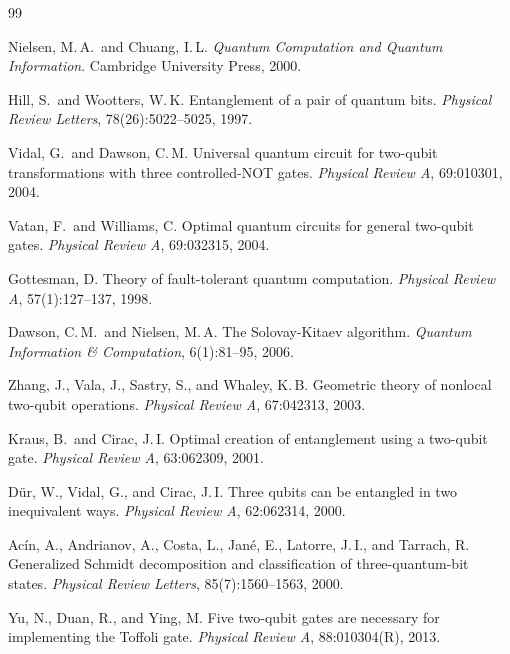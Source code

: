 \documentclass[12pt, a4paper, oneside]{report}
\theoremstyle{plain}
\theoremstyle{definition}
\theoremstyle{remark}
\begin{document}
\clearpage
{}

\begin{thebibliography}{99}

Nielsen, M.\,A.\ and Chuang, I.\,L.
\textit{Quantum Computation and Quantum Information}.
Cambridge University Press, 2000.

Hill, S.\ and Wootters, W.\,K.
Entanglement of a pair of quantum bits.
\textit{Physical Review Letters}, 78(26):5022--5025, 1997.

Vidal, G.\ and Dawson, C.\,M.
Universal quantum circuit for two-qubit transformations with three controlled-NOT gates.
\textit{Physical Review A}, 69:010301, 2004.

Vatan, F.\ and Williams, C.
Optimal quantum circuits for general two-qubit gates.
\textit{Physical Review A}, 69:032315, 2004.

Gottesman, D.
Theory of fault-tolerant quantum computation.
\textit{Physical Review A}, 57(1):127--137, 1998.

Dawson, C.\,M.\ and Nielsen, M.\,A.
The Solovay-Kitaev algorithm.
\textit{Quantum Information \& Computation}, 6(1):81--95, 2006.

Zhang, J., Vala, J., Sastry, S., and Whaley, K.\,B.
Geometric theory of nonlocal two-qubit operations.
\textit{Physical Review A}, 67:042313, 2003.

Kraus, B.\ and Cirac, J.\,I.
Optimal creation of entanglement using a two-qubit gate.
\textit{Physical Review A}, 63:062309, 2001.

D\"{u}r, W., Vidal, G., and Cirac, J.\,I.
Three qubits can be entangled in two inequivalent ways.
\textit{Physical Review A}, 62:062314, 2000.

Ac\'{i}n, A., Andrianov, A., Costa, L., Jan\'{e}, E., Latorre, J.\,I., and Tarrach, R.
Generalized Schmidt decomposition and classification of three-quantum-bit states.
\textit{Physical Review Letters}, 85(7):1560--1563, 2000.

Yu, N., Duan, R., and Ying, M.
Five two-qubit gates are necessary for implementing the Toffoli gate.
\textit{Physical Review A}, 88:010304(R), 2013.


\end{thebibliography}
\end{document}
